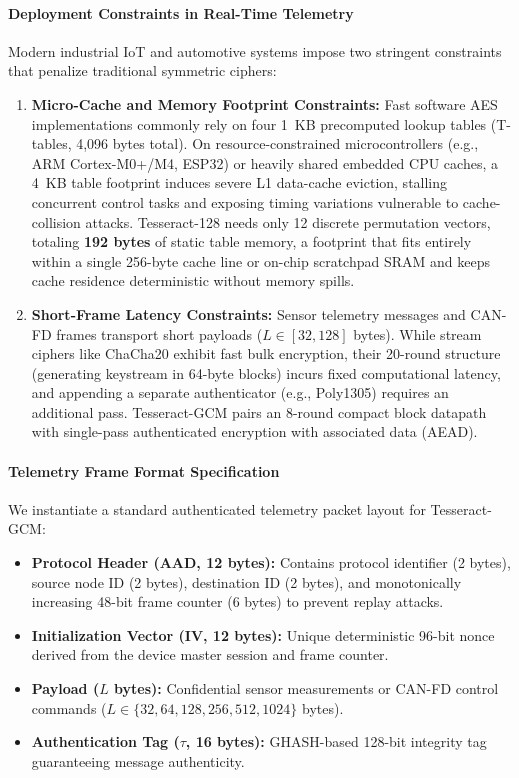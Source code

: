 \documentclass[10pt,twocolumn]{article}
\begin{document}
\paragraph{Deployment Constraints in Real-Time Telemetry}
Modern industrial IoT and automotive systems impose two stringent constraints that penalize traditional symmetric ciphers:
\begin{enumerate}
    \item \textbf{Micro-Cache and Memory Footprint Constraints:} Fast software AES implementations commonly rely on four 1~KB precomputed lookup tables (T-tables, 4,096 bytes total). On resource-constrained microcontrollers (e.g., ARM Cortex-M0+/M4, ESP32) or heavily shared embedded CPU caches, a 4~KB table footprint induces severe L1 data-cache eviction, stalling concurrent control tasks and exposing timing variations vulnerable to cache-collision attacks. Tesseract-128 needs only 12 discrete permutation vectors, totaling \textbf{192 bytes} of static table memory, a footprint that fits entirely within a single 256-byte cache line or on-chip scratchpad SRAM and keeps cache residence deterministic without memory spills.
    \item \textbf{Short-Frame Latency Constraints:} Sensor telemetry messages and CAN-FD frames transport short payloads ($L \in [32, 128]$ bytes). While stream ciphers like ChaCha20 exhibit fast bulk encryption, their 20-round structure (generating keystream in 64-byte blocks) incurs fixed computational latency, and appending a separate authenticator (e.g., Poly1305) requires an additional pass. Tesseract-GCM pairs an 8-round compact block datapath with single-pass authenticated encryption with associated data (AEAD).
\end{enumerate}

\paragraph{Telemetry Frame Format Specification}
We instantiate a standard authenticated telemetry packet layout for Tesseract-GCM:
\begin{itemize}
    \item \textbf{Protocol Header (AAD, 12 bytes):} Contains protocol identifier (2 bytes), source node ID (2 bytes), destination ID (2 bytes), and monotonically increasing 48-bit frame counter (6 bytes) to prevent replay attacks.
    \item \textbf{Initialization Vector (IV, 12 bytes):} Unique deterministic 96-bit nonce derived from the device master session and frame counter.
    \item \textbf{Payload ($L$ bytes):} Confidential sensor measurements or CAN-FD control commands ($L \in \{32, 64, 128, 256, 512, 1024\}$ bytes).
    \item \textbf{Authentication Tag ($\tau$, 16 bytes):} GHASH-based 128-bit integrity tag guaranteeing message authenticity.
\end{itemize}
\end{document}
